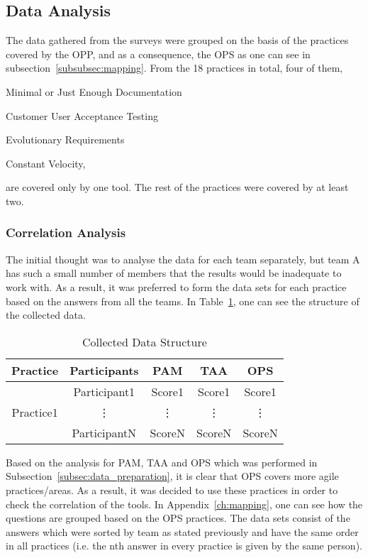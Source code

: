 \subsection{Data Analysis}

The data gathered from the surveys were grouped on the basis of the practices covered by the \ac{OPP}, and as a consequence, the \ac{OPS} as one can see in subsection~\ref{subsubsec:mapping}. From the 18 practices in total, four of them, \begin{inparaenum} [a\upshape)] \item Minimal or Just Enough Documentation \item Customer User Acceptance Testing \item Evolutionary Requirements \item Constant Velocity, \end{inparaenum} are covered only by one tool. The rest of the practices were covered by at least two.

\subsubsection{Correlation Analysis}
\label{subsubsec:correlation_analysis}
The initial thought was to analyse the data for each team separately, but team A has such a small number of members that the results would be inadequate to work with. As a result, it was preferred to form the data sets for each practice based on the answers from all the teams. In Table~\ref{table:data_structure}, one can see the structure of the collected data.

\begin{table} [H]
	\caption{Collected Data Structure}
	\label{table:data_structure}
	\begin{tabular}{| c | c | c | c | c |} \hline
	\textbf{Practice} & \textbf{Participants} & \textbf{\ac{PAM}} & \textbf{\ac{TAA}} & \textbf{\ac{OPS}} \\ \hline
	\multirow{3}{*}{Practice1} & Participant1 & Score1 & Score1 & Score1 \\ \hhline{~----}
	& \vdots & \vdots & \vdots  & \vdots \\ \hhline{~----}
	& ParticipantN & ScoreN & ScoreN & ScoreN \\ \hline
	\end{tabular}
\end{table}

Based on the analysis for \ac{PAM}, \ac{TAA} and \ac{OPS} which was  performed in Subsection~\ref{subsec:data_preparation}, it is clear that \ac{OPS} covers more agile practices/areas. As a result, it was decided to use these practices in order to check the correlation of the tools. In Appendix~\ref{ch:mapping}, one can see how the questions are grouped based on the \ac{OPS} practices. The data sets consist of the answers which were sorted by team as stated previously and have the same order in all practices (i.e. the nth answer in every practice is given by the same person).


